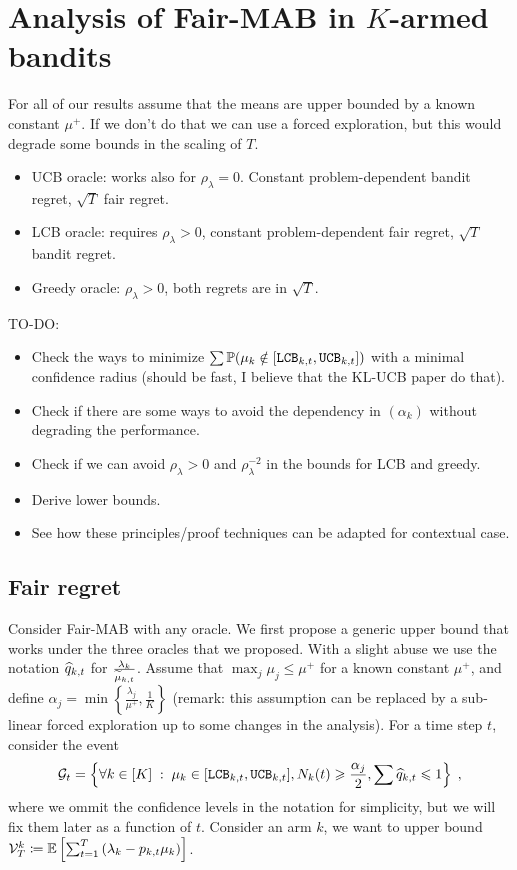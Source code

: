 \section{Analysis of Fair-MAB in $K$-armed bandits}

For all of our results assume that the means are upper bounded by a known constant $\mu^+$. If we don't do that we can use a forced exploration, but this would degrade some bounds in the scaling of $T$.
\begin{itemize}
	\item UCB oracle: works also for $\rho_\lambda=0$. Constant problem-dependent bandit regret, $\sqrt{T}$ fair regret.	
	\item LCB oracle: requires $\rho_\lambda>0$, constant problem-dependent fair regret, $\sqrt{T}$ bandit regret.
	\item Greedy oracle: $\rho_\lambda>0$, both regrets are in $\sqrt{T}$. 
\end{itemize}

TO-DO:
\begin{itemize}
	\item Check the ways to minimize $\sum \mathbb{P}(\mu_k \notin [\texttt{LCB}_{k,t}, \texttt{UCB}_{k, t}])$ with a minimal confidence radius (should be fast, I believe that the KL-UCB paper do that).
	\item Check if there are some ways to avoid the dependency in $(\alpha_k)$ without degrading the performance.
	\item Check if we can avoid $\rho_\lambda>0$ and $\rho_\lambda^{-2}$ in the bounds for LCB and greedy.
	\item Derive lower bounds.
	\item See how these principles/proof techniques can be adapted for contextual case.
\end{itemize}


\subsection{Fair regret}

Consider Fair-MAB with any oracle. We first propose a generic upper bound that works under the three oracles that we proposed. With a slight abuse we use the notation $\widehat{q}_{k,t}$ for $\frac{\lambda_k}{\widetilde{\mu}_{k, t}}$. Assume that $\max_j \mu_j \leq \mu^+$ for a known constant $\mu^+$, and define $\alpha_j = \min \left\{\frac{\lambda_j}{\mu^+}, \frac{1}{K} \right\}$ (remark: this assumption can be replaced by a sub-linear forced exploration up to some changes in the analysis). For a time step $t$, consider the event \[\mathcal{G}_t=\left\{ \forall k \in [K]\;:\; \mu_k \in [\texttt{LCB}_{k, t}, \texttt{UCB}_{k, t}], N_k(t)\geqslant \frac{\alpha_j}{2}, \sum \widehat{q}_{k,t} \leqslant 1 \right\}\;,\]
 where we ommit the confidence levels in the notation for simplicity, but we will fix them later as a function of $t$. Consider an arm $k$, we want to upper bound $\mathcal{V}_T^k \coloneqq \mathbb{E}\left[\sum_{t=1}^T \left(\lambda_k-p_{k,t} \mu_k \right)\right]$.
 
